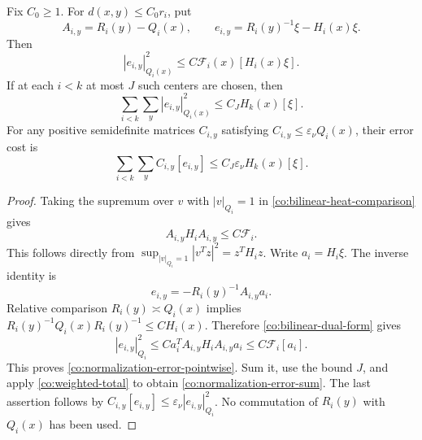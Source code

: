 \begin{lemma}\label{co:normalization-error}
Fix \(C_0\ge1\).  For \(d(x,y)\le C_0r_i\), put
\[
 A_{i,y}=R_i(y)-Q_i(x),\qquad
 e_{i,y}=R_i(y)^{-1}\xi-H_i(x)\xi.
\]
Then
\begin{equation}\label{co:normalization-error-pointwise}
 |e_{i,y}|_{Q_i(x)}^2
 \le C\mathcal F_i(x)[H_i(x)\xi].
\end{equation}
If at each \(i<k\) at most \(J\) such centers are chosen, then
\begin{equation}\label{co:normalization-error-sum}
 \sum_{i<k}\sum_y|e_{i,y}|_{Q_i(x)}^2
 \le C_J H_k(x)[\xi].
\end{equation}
For any positive semidefinite matrices \(C_{i,y}\) satisfying
\(C_{i,y}\le\varepsilon_\nu Q_i(x)\), their error cost is
\begin{equation}\label{co:normalization-mass-error}
 \sum_{i<k}\sum_y C_{i,y}[e_{i,y}]
 \le C_J\varepsilon_\nu H_k(x)[\xi].
\end{equation}
\end{lemma}

\begin{proof}
Taking the supremum over \(v\) with \(|v|_{Q_i}=1\) in
\eqref{co:bilinear-heat-comparison} gives
\begin{equation}\label{co:bilinear-dual-form}
 A_{i,y}H_iA_{i,y}\le C\mathcal F_i.
\end{equation}
This follows directly from
\(\sup_{|v|_{Q_i}=1}|v^Tz|^2=z^TH_i z\).
Write \(a_i=H_i\xi\).  The inverse identity is
\[
 e_{i,y}=-R_i(y)^{-1}A_{i,y}a_i.
\]
Relative comparison \(R_i(y)\asymp Q_i(x)\) implies
\(R_i(y)^{-1}Q_i(x)R_i(y)^{-1}\le C H_i(x)\).
Therefore \eqref{co:bilinear-dual-form} gives
\[
 |e_{i,y}|_{Q_i}^2
 \le C a_i^T A_{i,y}H_iA_{i,y}a_i
 \le C\mathcal F_i[a_i].
\]
This proves \eqref{co:normalization-error-pointwise}.  Sum it,
use the bound \(J\), and apply
\eqref{co:weighted-total} to obtain
\eqref{co:normalization-error-sum}.  The last assertion follows
by \(C_{i,y}[e_{i,y}]\le\varepsilon_\nu|e_{i,y}|_{Q_i}^2\).
No commutation of \(R_i(y)\) with \(Q_i(x)\) has been used.
\end{proof}

